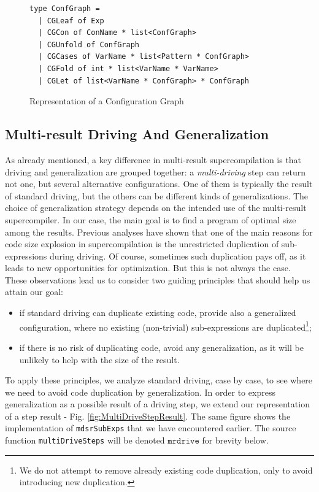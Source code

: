 \documentclass[submission,copyright,creativecommons]{eptcs}
\begin{document}
\begin{figure}
\begin{lstlisting}
type ConfGraph =
  | CGLeaf of Exp
  | CGCon of ConName * list<ConfGraph>
  | CGUnfold of ConfGraph
  | CGCases of VarName * list<Pattern * ConfGraph>
  | CGFold of int * list<VarName * VarName>
  | CGLet of list<VarName * ConfGraph> * ConfGraph
\end{lstlisting}
\caption{Representation of a Configuration Graph}
\label{fig:ConfGraph}
\end{figure}

\subsection{Multi-result Driving And Generalization}\label{sec:MRDriving}

As already mentioned, a key difference in multi-result supercompilation is
that driving and generalization are grouped together: a \emph{multi-driving}
step can return not one, but several alternative configurations.
One of them is typically the result of standard driving, but the others
can be different kinds of generalizations.
The choice of generalization strategy depends on the intended use of the
multi-result supercompiler.
In our case, the main goal is to find a program of optimal size among the results.
Previous analyses have shown that one of the main reasons for code size explosion in
supercompilation is the unrestricted duplication of sub-expressions during driving.
Of course, sometimes such duplication pays off, as it leads to new opportunities 
for optimization.
But this is not always the case.
These observations lead us to consider two guiding principles that should help us attain our goal:
\begin{itemize}
  \item if standard driving can duplicate existing code, provide also a generalized
    configuration, where no existing (non-trivial) sub-expressions are duplicated\footnote{
    We do not attempt to remove already existing code duplication, 
    only to avoid introducing new duplication.};
  \item if there is no risk of duplicating code, avoid any generalization, as it will
    be unlikely to help with the size of the result.
\end{itemize}
To apply these principles, we analyze standard driving, case by case, to see where
we need to avoid code duplication by generalization.
In order to express generalization as a possible result of a driving step,
we extend our representation of a step result - Fig. \ref{fig:MultiDriveStepResult}.
The same figure shows the implementation of \verb|mdsrSubExps| that we have encountered earlier.
The source function \verb|multiDriveSteps| will be denoted $\mathtt{mrdrive}$ for brevity below.
\end{document}
